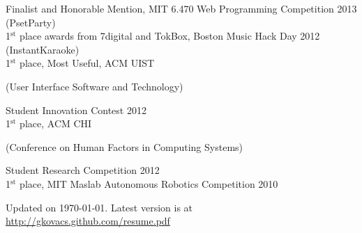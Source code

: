 \documentclass[margin,line]{resume}
\begin{document}
\begin{resume}
Finalist and Honorable Mention, MIT 6.470 Web Programming Competition 2013 (PsetParty)\\
1$^{\textrm{st}}$ place awards from 7digital and TokBox, Boston Music Hack Day 2012 (InstantKaraoke)\\
1$^{\textrm{st}}$ place, Most Useful, ACM UIST \begin{small}(User Interface Software and Technology)\end{small} Student Innovation Contest 2012\\
1$^{\textrm{st}}$ place, ACM CHI \begin{small}(Conference on Human Factors in Computing Systems)\end{small} Student Research Competition 2012\\
1$^{\textrm{st}}$ place, MIT Maslab Autonomous Robotics Competition 2010

\vspace{-3mm}

\begin{small}
\begin{center}
Updated on \today. Latest version is at \url{http://gkovacs.github.com/resume.pdf}
\end{center}
\end{small}

\end{resume}
\end{document}
